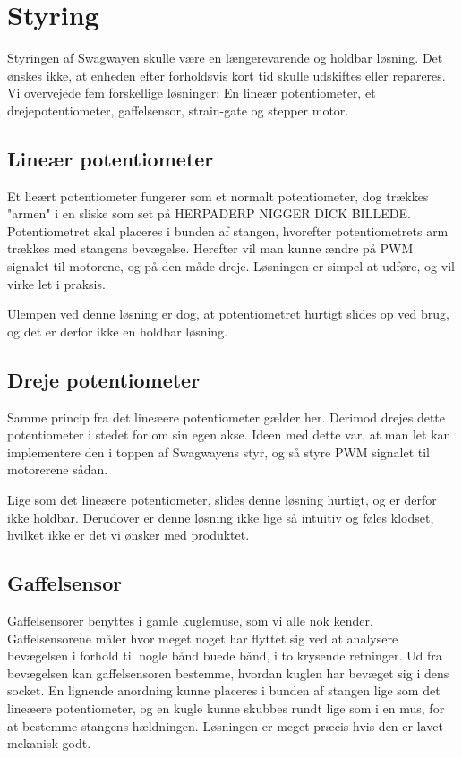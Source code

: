 \documentclass[a4paper,oneside,article,danish,table]{memoir}
\begin{document}
\section{Styring}
Styringen af Swagwayen skulle være en længerevarende og holdbar løsning. Det ønskes ikke, at enheden efter forholdsvis kort tid skulle udskiftes eller repareres. Vi overvejede fem forskellige løsninger: En lineær potentiometer, et drejepotentiometer, gaffelsensor, strain-gate og stepper motor.
\subsection{Lineær potentiometer} 
Et lieært potentiometer fungerer som et normalt potentiometer, dog trækkes "armen" i en sliske som set på HERPADERP NIGGER DICK BILLEDE. 
Potentiometret skal placeres i bunden af stangen, hvorefter potentiometrets arm trækkes med stangens bevægelse. Herefter vil man kunne ændre på PWM signalet til motorene, og på den måde dreje. Løsningen er simpel at udføre, og vil virke let i praksis.

Ulempen ved denne løsning er dog, at potentiometret hurtigt slides op ved brug, og det er derfor ikke en holdbar løsning.
\subsection{Dreje potentiometer}
Samme princip fra det lineæere potentiometer gælder her. Derimod drejes dette potentiometer i stedet for om sin egen akse. Ideen med dette var, at man let kan implementere den i toppen af Swagwayens styr, og så styre PWM signalet til motorerene sådan. 

Lige som det lineæere potentiometer, slides denne løsning hurtigt, og er derfor ikke holdbar. Derudover er denne løsning ikke lige så intuitiv og føles klodset, hvilket ikke er det vi ønsker med produktet.
\subsection{Gaffelsensor}
Gaffelsensorer benyttes i gamle kuglemuse, som vi alle nok kender. Gaffelsensorene måler hvor meget noget har flyttet sig ved at analysere bevægelsen i forhold til nogle bånd buede bånd, i to krysende retninger. Ud fra bevægelsen kan gaffelsensoren bestemme, hvordan kuglen har bevæget sig i dens socket. En lignende anordning kunne placeres i bunden af stangen lige som det lineæere potentiometer, og en kugle kunne skubbes rundt lige som i en mus, for at bestemme stangens hældningen. Løsningen er meget præcis hvis den er lavet mekanisk godt.
\end{document}
